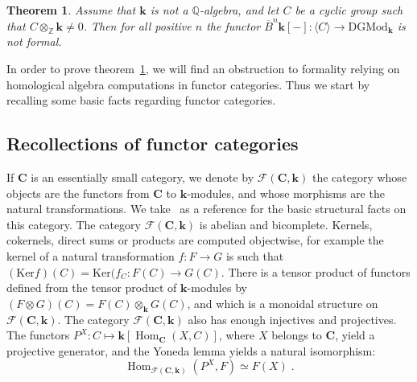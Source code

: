 \documentclass{amsart}
\newtheorem{theorem}[formula]{Theorem}
\theoremstyle{definition}
\theoremstyle{remark}
\newcommand{\Z}{\mathbb Z}
\newcommand{\Q}{\mathbb Q}
\DeclareMathOperator{\Hm}{Hom}
\newcommand{\Cc}{\mathbf{C}}
\def\k{\mathbf{k}}
\begin{document}
\begin{theorem}\label{thm:nonformality}
	Assume that $\k$ is not a $\Q$-algebra, and let $C$ be a cyclic group such that $C\otimes_{\Z}\k\ne 0$. Then for all positive $n$ the functor $\overline{B}^n\k[-]:\langle C\rangle\to \mathrm{DGMod}_\k$ is not formal.
\end{theorem}
	
In order to prove theorem~\ref{thm:nonformality}, we will find an obstruction to formality  relying on homological algebra computations in functor categories. Thus we start by recalling some basic facts regarding functor categories.

\subsection{Recollections of functor categories}\label{subsec:recollectF}
If $\Cc$ is an essentially small category, we denote by $\mathcal{F}(\Cc,\k)$ the category whose objects are the functors from $\Cc$ to $\k$-modules, and whose morphisms are the natural transformations. 
We take~\cite{mi-72} as a reference for the basic structural facts on this category.
The category $\mathcal{F}(\Cc,\k)$ is abelian and bicomplete. Kernels, cokernels, direct sums or products are computed objectwise, for example the kernel of a natural transformation $f\colon F\to G$ is such that $(\mathrm{Ker} f)(C)=\mathrm{Ker}(f_C\colon F(C)\to G(C)$. There is a tensor product of functors defined from the tensor product of $\k$-modules by $(F\otimes G)(C)=F(C)\otimes_\k G(C)$, and which is a monoidal structure on $\mathcal{F}(\Cc,\k)$. The category $\mathcal{F}(\Cc,\k)$ also has enough injectives and projectives. The functors $P^X\colon C\mapsto \k[\Hm_\Cc(X,C)]$, where $X$ belongs to $\Cc$, yield a projective generator, and the Yoneda lemma yields a natural isomorphism:
\[
	\Hm_{\mathcal{F}(\Cc,\k)}(P^X,F)\simeq F(X)\;.
\]
\end{document}
